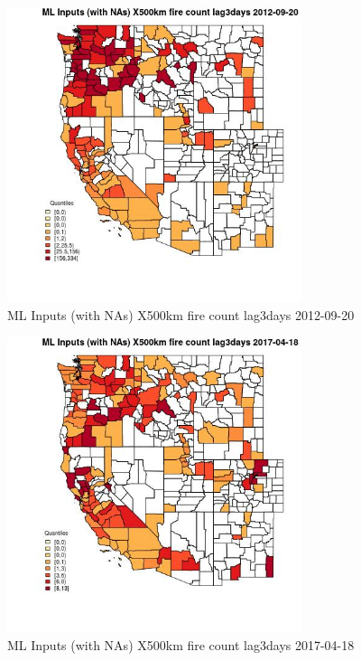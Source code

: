 \begin{figure} 
\centering  
\includegraphics[width=0.77\textwidth]{Code_Outputs/Report_ML_input_PM25_Step4_part_e_de_duplicated_aves_compiled_2019-05-14wNAs_CountyX500km_fire_count_lag3daysMean2012-09-20_2012-09-20.jpg} 
\caption{\label{fig:Report_ML_input_PM25_Step4_part_e_de_duplicated_aves_compiled_2019-05-14wNAsCountyX500km_fire_count_lag3daysMean2012-09-20_2012-09-20}ML Inputs (with NAs) X500km fire count lag3days 2012-09-20} 
\end{figure} 
 

\begin{figure} 
\centering  
\includegraphics[width=0.77\textwidth]{Code_Outputs/Report_ML_input_PM25_Step4_part_e_de_duplicated_aves_compiled_2019-05-14wNAs_CountyX500km_fire_count_lag3daysMean2017-04-18_2017-04-18.jpg} 
\caption{\label{fig:Report_ML_input_PM25_Step4_part_e_de_duplicated_aves_compiled_2019-05-14wNAsCountyX500km_fire_count_lag3daysMean2017-04-18_2017-04-18}ML Inputs (with NAs) X500km fire count lag3days 2017-04-18} 
\end{figure} 
 

